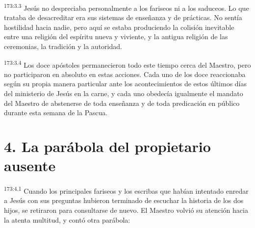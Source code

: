 \par
\textsuperscript{173:3.3} Jesús no despreciaba personalmente a los fariseos ni a los saduceos. Lo que trataba de desacreditar era sus sistemas de enseñanza y de prácticas. No sentía hostilidad hacia nadie, pero aquí se estaba produciendo la colisión inevitable entre una religión del espíritu nueva y viviente, y la antigua religión de las ceremonias, la tradición y la autoridad.

\par
\textsuperscript{173:3.4} Los doce apóstoles permanecieron todo este tiempo cerca del Maestro, pero no participaron en absoluto en estas acciones. Cada uno de los doce reaccionaba según su propia manera particular ante los acontecimientos de estos últimos días del ministerio de Jesús en la carne, y cada uno obedecía igualmente el mandato del Maestro de abstenerse de toda enseñanza y de toda predicación en público durante esta semana de la Pascua.

\section*{4. La parábola del propietario ausente}
\par
\textsuperscript{173:4.1} Cuando los principales fariseos y los escribas que habían intentado enredar a Jesús con sus preguntas hubieron terminado de escuchar la historia de los dos hijos, se retiraron para consultarse de nuevo. El Maestro volvió su atención hacia la atenta multitud, y contó otra parábola:

